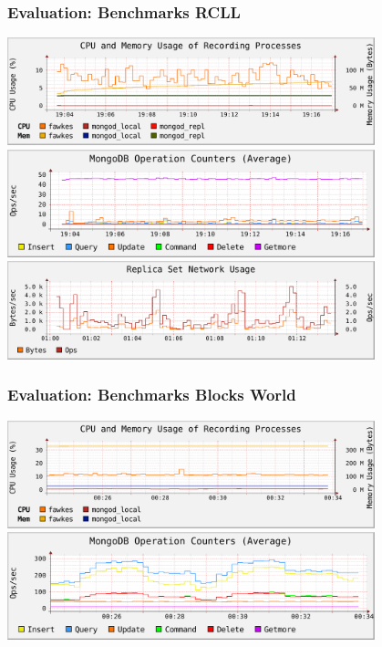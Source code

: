 \begin{frame}
  \frametitle{Evaluation: Benchmarks RCLL}
  \centering
  \includegraphics[width=0.8\textwidth]{../thesis/plots/rcll-local/cpu-mem}\\
  \vspace{0.1cm}
  \includegraphics[width=0.8\textwidth]{../thesis/plots/rcll-local/operations}\\
  \vspace{0.1cm}
  \includegraphics[width=0.8\textwidth]{../thesis/plots/rsnetwork}
\end{frame}

\begin{frame}
  \frametitle{Evaluation: Benchmarks Blocks World}
  \centering
  \includegraphics[width=0.8\textwidth]{../thesis/plots/blocksworld/cpu-mem}\\
  \vspace{0.1cm}
  \includegraphics[width=0.8\textwidth]{../thesis/plots/blocksworld/operations}
\end{frame}

\setcounter{framenumber}{\value{finalframe}}


